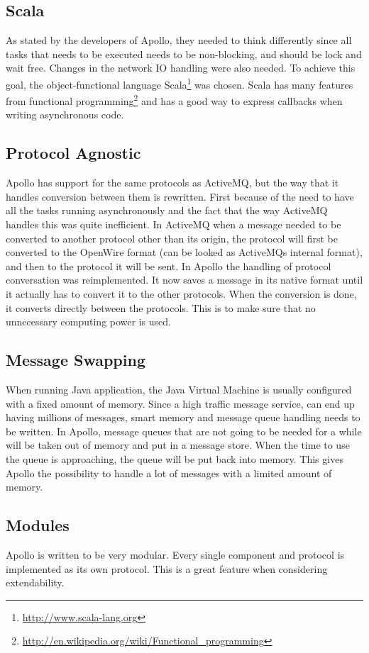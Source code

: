 \subsection{Scala}
As stated by the developers of Apollo, they needed to think differently since all tasks that needs to be executed needs to be non-blocking, and should be lock and wait free. Changes in the network IO handling were also needed. To achieve this goal, the object-functional language Scala\footnote{\url{http://www.scala-lang.org}} was chosen. Scala has many features from functional programming\footnote{\url{http://en.wikipedia.org/wiki/Functional_programming}} and has a good way to express callbacks when writing asynchronous code.

\subsection{Protocol Agnostic}
Apollo has support for the same protocols as ActiveMQ, but the way that it handles conversion between them is rewritten. First because of the need to have all the tasks running asynchronously and the fact that the way ActiveMQ handles this was quite inefficient. 
In ActiveMQ when a message needed to be converted to another protocol other than its origin, the protocol will first be converted to the OpenWire format (can be looked as ActiveMQs internal format), and then to the protocol it will be sent. 
In Apollo the handling of protocol conversation was reimplemented. It now saves a message in its native format until it actually has to convert it to the other protocols. When the conversion is done, it converts directly between the protocols. This is to make sure that no unnecessary computing power is used.

\subsection{Message Swapping}
When running Java application, the Java Virtual Machine is usually configured with a fixed amount of memory. Since a high traffic message service, can end up having millions of messages, smart memory and message queue handling needs to be written. 
In Apollo, message queues that are not going to be needed for a while will be taken out of memory and put in a message store. When the time to use the queue is approaching, the queue will be put back into memory. This gives Apollo the possibility to handle a lot of messages with a limited amount of memory.

\subsection{Modules}
Apollo is written to be very modular. Every single component and protocol is implemented as its own protocol. This is a great feature when considering extendability. 


